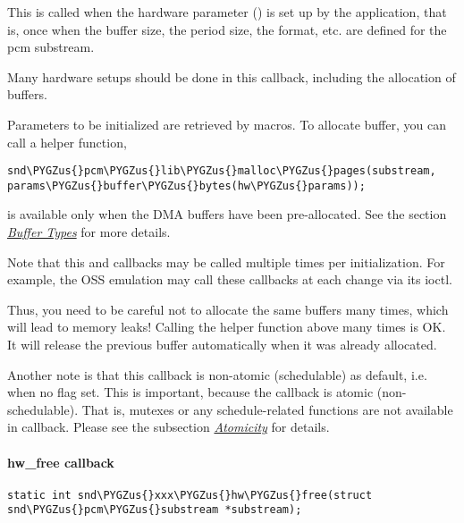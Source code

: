 \documentclass[a4paper,8pt,english]{sphinxmanual}
\def\PYGZus{\char`\_}
\begin{document}
This is called when the hardware parameter () is set up
by the application, that is, once when the buffer size, the period
size, the format, etc. are defined for the pcm substream.

Many hardware setups should be done in this callback, including the
allocation of buffers.

Parameters to be initialized are retrieved by
 macros. To allocate buffer, you can call a
helper function,

\begin{Verbatim}[commandchars=\\\{\}]
snd\PYGZus{}pcm\PYGZus{}lib\PYGZus{}malloc\PYGZus{}pages(substream, params\PYGZus{}buffer\PYGZus{}bytes(hw\PYGZus{}params));
\end{Verbatim}

 is available only when the
DMA buffers have been pre-allocated. See the section {\hyperref[sound/kernel\string-api/writing\string-an\string-alsa\string-driver:buffer\string-types]{\emph{Buffer Types}}}
for more details.

Note that this and  callbacks may be called multiple times
per initialization. For example, the OSS emulation may call these
callbacks at each change via its ioctl.

Thus, you need to be careful not to allocate the same buffers many
times, which will lead to memory leaks! Calling the helper function
above many times is OK. It will release the previous buffer
automatically when it was already allocated.

Another note is that this callback is non-atomic (schedulable) as
default, i.e. when no  flag set. This is important,
because the  callback is atomic (non-schedulable). That is,
mutexes or any schedule-related functions are not available in
 callback. Please see the subsection {\hyperref[sound/kernel\string-api/writing\string-an\string-alsa\string-driver:atomicity]{\emph{Atomicity}}} for
details.


\paragraph{hw\_free callback}
\label{sound/kernel-api/writing-an-alsa-driver:hw-free-callback}
\begin{Verbatim}[commandchars=\\\{\}]
static int snd\PYGZus{}xxx\PYGZus{}hw\PYGZus{}free(struct snd\PYGZus{}pcm\PYGZus{}substream *substream);
\end{Verbatim}
\end{document}
